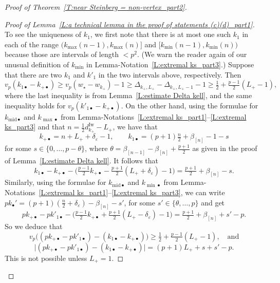 \documentclass[12pt]{amsart}
\theoremstyle{definition}
\numberwithin{equation}{subsection}
\newcommand{\Iw}{\mathrm{Iw}}
\newcommand{\midd}{\mathrm{mid}}
\begin{document}
\begin{proof}[Proof of Theorem~\ref{T:near Steinberg = non-vertex_part2}]
\begin{proof}[Proof of Lemma~\ref{L:a technical lemma in the proof of statements (c)(d)_part1}]

To see the uniqueness of $k_1$, we first note that there is at most one such $k_1$ in each of the range $\big( k_{\max}(n-1), k_{\max}(n)\big]$ and $ \big[ k_{\min}(n-1), k_{\min}(n)\big)$ because those are intervals of length $< p^2$. (We warn the reader again of our unusual definition of $k_{\min}$ in Lemma-Notation~\ref{L:extremal ks_part3}.) Suppose that there are two $k_1$ and $k'_1$ in the two intervals above, respectively. Then 
\begin{equation}
\label{E:vp of k1-k+}
v_p(k_{1\bullet}-k_{+\bullet}) \geq v_p(w_\star - w_{k_+})-1 \geq \Delta_{k_+, L_+}-\Delta_{k_+, L_+-1}-1 \geq \tfrac 12+ \tfrac {p-1}2(L_+-1),
\end{equation}
where the last inequality is from Lemma~\ref{L:estimate Delta kell}, and the same inequality holds for $v_p(k'_{1\bullet}-k_{+\bullet})$.
On the other hand, using the formulae for $k_{\midd\bullet}$ and $k_{\max\bullet}$ from Lemma-Notations~\ref{L:extremal ks_part1}--\ref{L:extremal ks_part3} and that $n = \frac12 d_{k_+}^\Iw-L_+$, we have that
\[
k_{+\bullet}=n+L_++\delta_\varepsilon-1, \qquad k_{1\bullet}= (p+1)\tfrac {n}2 +  \beta_{[n]}-1-s
\]
for some $s \in \{0, \dots, p-\theta\}$,  where $\theta = \beta_{[n-1]}-\beta_{[n]}+\frac{p+1}2$ as given in the proof of Lemma~\ref{L:estimate Delta kell}. 
It follows that
\begin{equation}
\label{E:k1-k+-s}
k_{1\bullet} - k_{+\bullet} - \big(\tfrac{p-1}2k_{+\bullet} - \tfrac{p+1}2 (L_++\delta_\varepsilon)-1\big)  = \tfrac{p+1}2 + \beta_{[n]}-s.
\end{equation}
Similarly, using the formulae for $k_{\midd\bullet}$ and $k_{\min\bullet}$  from Lemma-Notations~\ref{L:extremal ks_part1}--\ref{L:extremal ks_part3}, we can write $pk_\bullet'=(p+1)(\frac n2+\delta_{\varepsilon })-\beta_{[n]}-s'$, for some $s'\in \{\theta,\dots, p \}$ and 
get
$$
pk_{+\bullet} -pk'_{1\bullet} -  \big(\tfrac{p-1}2k_{+\bullet} + \tfrac{p+1}2( L_+-\delta_\varepsilon)-1\big) =\tfrac{p+1}2+\beta_{[n]}+s'-p.
$$
So we deduce that
$$
v_p\big( (pk_{+\bullet}-pk'_{1\bullet}) - (k_{1\bullet} - k_{+\bullet})\big)  \geq \tfrac 12 + \tfrac {p-1}2(L_+-1), \quad \textrm{and}
$$
$$
\big|(pk_{+\bullet}-pk'_{1\bullet}) - (k_{1\bullet} - k_{+\bullet})\big| = (p+1)L_+ + s+s'-p.
$$
This is not possible unless $L_+  =1$. 
\end{proof}


\end{proof}
\end{document}
